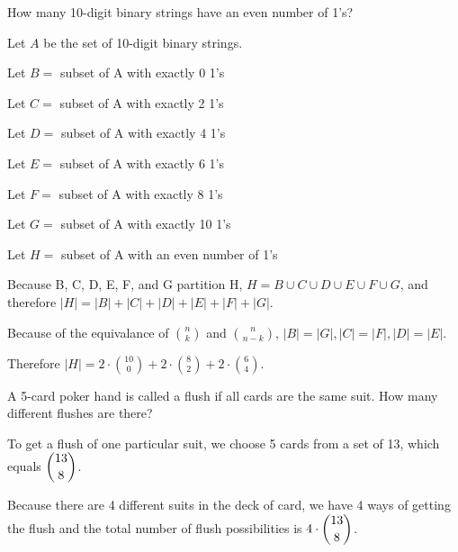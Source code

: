 \documentclass[openany, 11pt]{book}
\begin{document}
\begin{exercise}{}{}
	How many 10-digit binary strings have an even number of 1's?
	\begin{alist}
		\item Let $A$ be the set of 10-digit binary strings.
		\item Let $B=$ subset of A with exactly 0 1's
		\item Let $C=$ subset of A with exactly 2 1's
		\item Let $D=$ subset of A with exactly 4 1's
		\item Let $E=$ subset of A with exactly 6 1's
		\item Let $F=$ subset of A with exactly 8 1's
		\item Let $G=$ subset of A with exactly 10 1's
		\item Let $H=$ subset of A with an even number of 1's
		\item Because B, C, D, E, F, and G partition H, $H=B\cup C\cup D\cup E \cup
			F \cup G$, and therefore $|H|=|B| + |C| + |D| + |E| + |F| + |G|$.
		\item Because of the equivalance of $\binom{n}{k}$ and $\binom{n}{n-k}$,
		$|B|=|G|, |C|=|F|, |D|=|E|$.
		\item Therefore $|H| =
			2\cdot \binom{10}{0} +
			2\cdot \binom{8}{2} +
			2\cdot \binom{6}{4}$.
	\end{alist}
\end{exercise}

\begin{exercise}{}{}
	A 5-card poker hand is called a flush if all cards are the same suit. How
	many different flushes are there?
	\begin{alist}
		\item To get a flush of one particular suit, we choose 5 cards from a set of 13,
		which equals $\dbinom{13}{8}$.
		\item Because there are 4 different suits in the deck of card, we have 4 ways of
		getting the flush and the total number of flush possibilities is $4 \cdot
			\dbinom{13}{8}$.
	\end{alist}
\end{exercise}
\end{document}
